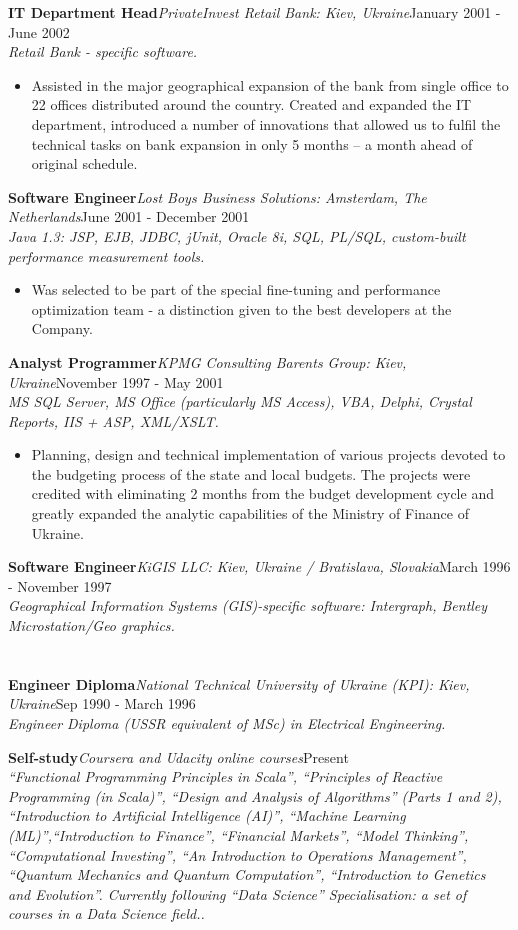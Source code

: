 \documentclass{res}
\newcommand{\jobdes}[4]{\needspace{3\baselineskip} %
{\noindent \bf #3\hspace{2ex}}{{\em \small #1}}{\hfill #2}\\{{\it \small #4.}}}
\newcommand{\osection}[1]{\section{\sc {\Large \textbf{#1}\\}} \vspace{0.30cm}}
\begin{document}
\begin{resume}
\jobdes {PrivateInvest Retail Bank: Kiev, Ukraine}{January 2001 - June 2002}{IT Department Head}
{Retail Bank - specific software}
\begin{itemize} \itemsep -2pt %
 \item Assisted in the major geographical expansion of the bank from single office to 22 offices distributed around the country. Created and expanded  the IT department, introduced a number of innovations that allowed us to fulfil the technical tasks on bank expansion in only 5 months – a month ahead of original schedule.
\end{itemize}

\jobdes {Lost Boys Business Solutions: Amsterdam, The Netherlands}{June 2001 - December 2001}{Software Engineer}
{Java 1.3: JSP, EJB, JDBC, jUnit, Oracle 8i, SQL, PL/SQL, custom-built performance measurement tools}
\begin{itemize} \itemsep -2pt %
 \item Was selected to be part of the special fine-tuning and performance optimization team - a distinction given to the best developers at the Company.
\end{itemize}
\jobdes {KPMG Consulting Barents Group: Kiev, Ukraine}{November 1997 - May 2001}{Analyst Programmer}
{MS SQL Server, MS Office (particularly MS Access), VBA, Delphi, Crystal Reports, IIS + ASP, XML/XSLT}
\begin{itemize}
 \item Planning, design and technical implementation of various projects devoted to the budgeting process of the state and local budgets.  The projects were credited with eliminating 2 months from the budget development cycle and greatly expanded the analytic capabilities of the Ministry of Finance of Ukraine.
\end{itemize}
\jobdes {KiGIS LLC: Kiev, Ukraine / Bratislava, Slovakia}{March 1996 - November 1997}{Software Engineer}
{Geographical Information Systems (GIS)-specific software: Intergraph, Bentley Microstation/Geo graphics}

\osection{EDUCATION}
\jobdes {National Technical University of Ukraine (KPI): Kiev, Ukraine}{Sep 1990 - March 1996}{Engineer Diploma}
 {Engineer Diploma (USSR equivalent of MSc) in Electrical Engineering}

\jobdes {Coursera and Udacity online courses}{Present}{Self-study}
{``Functional Programming Principles in Scala'', ``Principles of Reactive Programming (in Scala)'', ``Design and Analysis of Algorithms'' (Parts 1 and 2), ``Introduction to Artificial Intelligence (AI)'', ``Machine Learning (ML)'',``Introduction to Finance'', ``Financial Markets'', ``Model Thinking'', ``Computational Investing'', ``An Introduction to Operations Management'', ``Quantum Mechanics and Quantum Computation'', ``Introduction to Genetics and Evolution''. Currently following ``Data Science'' Specialisation: a set of courses in a Data Science field.}


\end{resume}
\end{document}
